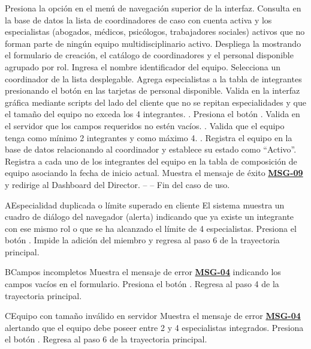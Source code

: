 \begin{UCtrayectoria}
	\UCpaso[\UCactor] Presiona la opción  en el menú de navegación superior de la interfaz.
	\UCpaso Consulta en la base de datos la lista de coordinadores de caso con cuenta activa y los especialistas (abogados, médicos, psicólogos, trabajadores sociales) activos que no forman parte de ningún equipo multidisciplinario activo.
	\UCpaso Despliega la  mostrando el formulario de creación, el catálogo de coordinadores y el personal disponible agrupado por rol.
	\UCpaso[\UCactor] Ingresa el nombre identificador del equipo.
	\UCpaso[\UCactor] Selecciona un coordinador de la lista desplegable.
	\UCpaso[\UCactor] Agrega especialistas a la tabla de integrantes presionando el botón \IUbutton{+} en las tarjetas de personal disponible.
	\UCpaso Valida en la interfaz gráfica mediante scripts del lado del cliente que no se repitan especialidades y que el tamaño del equipo no exceda los 4 integrantes. .
	\UCpaso[\UCactor] Presiona el botón .
	\UCpaso Valida en el servidor que los campos requeridos no estén vacíos. .
	\UCpaso Valida que el equipo tenga como mínimo 2 integrantes y como máximo 4. .
	\UCpaso Registra el equipo en la base de datos relacionando al coordinador y establece su estado como ``Activo''.
	\UCpaso Registra a cada uno de los integrantes del equipo en la tabla de composición de equipo asociando la fecha de inicio actual.
	\UCpaso Muestra el mensaje de éxito \hyperlink{mMSG09}{\bf MSG-09} y redirige al Dashboard del Director.
	\UCpaso[] -- -- Fin del caso de uso.
\end{UCtrayectoria}

\begin{UCtrayectoriaA}{A}{Especialidad duplicada o límite superado en cliente}
	\UCpaso El sistema muestra un cuadro de diálogo del navegador (alerta) indicando que ya existe un integrante con ese mismo rol o que se ha alcanzado el límite de 4 especialistas.
	\UCpaso[\UCactor] Presiona el botón .
	\UCpaso Impide la adición del miembro y regresa al paso 6 de la trayectoria principal.
\end{UCtrayectoriaA}

\begin{UCtrayectoriaA}{B}{Campos incompletos}
	\UCpaso Muestra el mensaje de error \hyperlink{mMSG04}{\bf MSG-04} indicando los campos vacíos en el formulario.
	\UCpaso[\UCactor] Presiona el botón .
	\UCpaso Regresa al paso 4 de la trayectoria principal.
\end{UCtrayectoriaA}

\begin{UCtrayectoriaA}{C}{Equipo con tamaño inválido en servidor}
	\UCpaso Muestra el mensaje de error \hyperlink{mMSG04}{\bf MSG-04} alertando que el equipo debe poseer entre 2 y 4 especialistas integrados.
	\UCpaso[\UCactor] Presiona el botón .
	\UCpaso Regresa al paso 6 de la trayectoria principal.
\end{UCtrayectoriaA}
